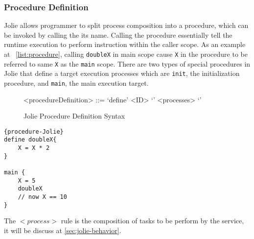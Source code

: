 \subsubsection{Procedure Definition}
\label{sec:jolie-procedure-def}

Jolie allows programmer to split process composition into a procedure, which can be invoked by calling the its name. Calling the procedure essentially tell the runtime execution to perform instruction within the caller scope. As an example at ~\ref{list:procedure}, calling \texttt{doubleX} in main scope cause \texttt{X} in the procedure to be referred to same \texttt{X} as the \texttt{main} scope. There are two types of special procedures in Jolie that define a target execution processes which are \texttt{init}, the initialization procedure, and \texttt{main}, the main execution target.

\begin{figure}[h]
	\begin{framed}
		\begin{grammar}
			<procedureDefinition> ::= `define' <ID> `{' <processes> `}'
		\end{grammar}
	\end{framed}
	\caption{Jolie Procedure Definition Syntax}
\end{figure}


\begin{listing}[h]
\lstset{language=Jolie,
	style=codeStyle
}
\begin{lstlisting}[frame=tlrb, caption= {Jolie procedure example}, label={list:procedure}]{procedure-Jolie}
define doubleX{
	X = X * 2
}

main {
	X = 5
	doubleX
	// now X == 10
}
\end{lstlisting}
\caption{Jolie procedure example}
\label{list:procedure}
\end{listing}

The \(<process>\) rule is the composition of tasks to be perform by the service, it will be discuss at \autoref{sec:jolie-behavior}.

\FloatBarrier
